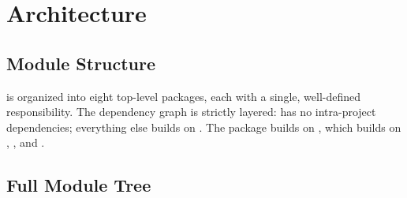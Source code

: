 
\chapter{Architecture}
\label{ch:architecture}

\section{Module Structure}

\itc{} is organized into eight top-level packages, each with a single,
well-defined responsibility. The dependency graph is strictly layered:
 has no intra-project dependencies; everything else builds on
. The  package builds on , which
builds on , , and .

\section{Full Module Tree}

